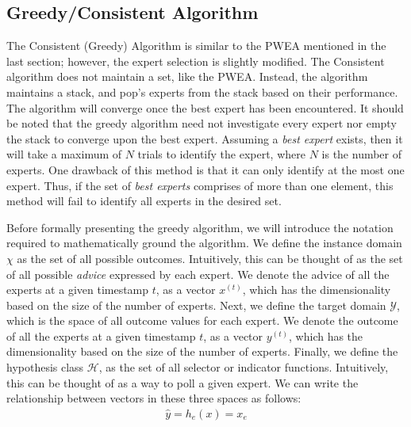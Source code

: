 \documentclass[11pt]{article}
\begin{document}
\subsection{Greedy/Consistent Algorithm}
\normalfont
The Consistent (Greedy) Algorithm is similar to the PWEA mentioned in the last section; however, the expert selection is slightly modified. The Consistent algorithm does not maintain a set, like the PWEA. Instead, the algorithm maintains a stack, and pop's experts from the stack based on their performance. The algorithm will converge once the best expert has been encountered. It should be noted that the greedy algorithm need not investigate every expert nor empty the stack to converge upon the best expert. Assuming a \textit{best expert} exists, then it will take a maximum of $N$ trials to identify the expert, where $N$ is the number of experts. One drawback of this method is that it can only identify at the most one expert. Thus, if the set of \textit{best experts} comprises of more than one element, this method will fail to identify all experts in the desired set.

Before formally presenting the greedy algorithm, we will introduce the notation required to mathematically ground the algorithm. We define the instance domain $\chi$ as the set of all possible outcomes. Intuitively, this can be thought of as the set of all possible \textit{advice} expressed by each expert. We denote the advice of all the experts at a given timestamp $t$, as a vector $x^{(t)}$, which has the dimensionality based on the size of the number of experts. Next, we define the target domain $\mathcal{Y}$, which is the space of all outcome values for each expert. We denote the outcome of all the experts at a given timestamp $t$, as a vector $y^{(t)}$, which has the dimensionality based on the size of the number of experts. Finally, we define the hypothesis class $\mathcal{H}$, as the set of all selector or indicator functions. Intuitively, this can be thought of as a way to poll a given expert. We can write the relationship between vectors in these three spaces as follows:
\begin{align}
  \hat{y} = h_e(x)=x_e
\end{align}
\end{document}
